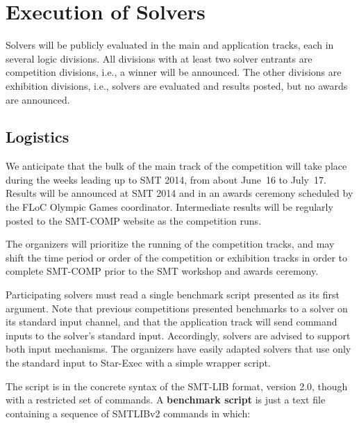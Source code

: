 \documentclass[12pt]{article}
\begin{document}
\section{Execution of Solvers}
\label{sec:exec}

Solvers will be publicly evaluated in the main and application tracks, each in several logic divisions. 
All divisions with at least two solver entrants are competition divisions, i.e., a winner will be announced. The other divisions are exhibition divisions, i.e., solvers are evaluated and results posted, but no awards are announced.

\subsection{Logistics}

%
We anticipate that the bulk of the main track of the competition will take place during
the weeks leading up to SMT 2014, from about June~16 to July~17.  Results will be
announced at SMT 2014 and in an awards ceremony scheduled by the FLoC Olympic Games coordinator.
  Intermediate results
will be regularly posted to the SMT-COMP website as the competition
runs.


The organizers will prioritize the running of the competition tracks, and may shift the
time period or order of the competition or exhibition tracks in order to complete SMT-COMP
prior to the SMT workshop and awards ceremony.

%
Participating solvers must read a single benchmark script presented as its first argument.
Note that previous competitions presented benchmarks to a solver on its standard input
channel, and that the application track will send command inputs to the solver's standard input.
Accordingly, solvers are advised to support both input mechanisms. The organizers have easily adapted solvers that use only the standard input to Star-Exec with a simple wrapper script.

 The script is in the concrete syntax of the SMT-LIB format,
version 2.0, though with a restricted set of commands.   A
\textbf{benchmark script} is just a text file containing a sequence of SMTLIBv2 commands in which:
\end{document}
